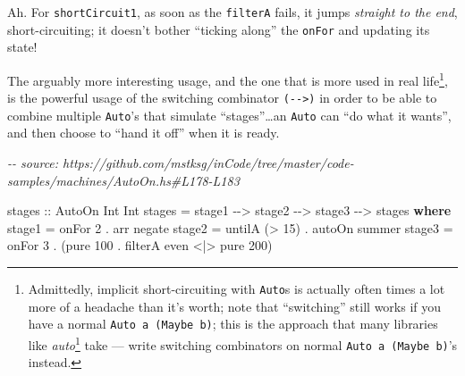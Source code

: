 \documentclass[]{article}
\newenvironment{Shaded}{}{}
\newcommand{\CommentTok}[1]{\textcolor[rgb]{0.38,0.63,0.69}{\textit{#1}}}
\newcommand{\DataTypeTok}[1]{\textcolor[rgb]{0.56,0.13,0.00}{#1}}
\newcommand{\DecValTok}[1]{\textcolor[rgb]{0.25,0.63,0.44}{#1}}
\newcommand{\FunctionTok}[1]{\textcolor[rgb]{0.02,0.16,0.49}{#1}}
\newcommand{\KeywordTok}[1]{\textcolor[rgb]{0.00,0.44,0.13}{\textbf{#1}}}
\newcommand{\NormalTok}[1]{#1}
\newcommand{\OperatorTok}[1]{\textcolor[rgb]{0.40,0.40,0.40}{#1}}
\newcommand{\OtherTok}[1]{\textcolor[rgb]{0.00,0.44,0.13}{#1}}
\renewcommand{\href}[2]{#2\footnote{\url{#1}}}
\begin{document}
Ah. For \texttt{shortCircuit1}, as soon as the \texttt{filterA} fails, it jumps
\emph{straight to the end}, short-circuiting; it doesn't bother ``ticking
along'' the \texttt{onFor} and updating its state!

The arguably more interesting usage, and the one that is more used in real
life\footnote{Admittedly, implicit short-circuiting with \texttt{Auto}s is
  actually often times a lot more of a headache than it's worth; note that
  ``switching'' still works if you have a normal \texttt{Auto\ a\ (Maybe\ b)};
  this is the approach that many libraries like
  \href{https://github.com/mstksg/auto.}{\emph{auto}} take --- write switching
  combinators on normal \texttt{Auto\ a\ (Maybe\ b)}'s instead.}, is the
powerful usage of the switching combinator \texttt{(-\/-\textgreater{})} in
order to be able to combine multiple \texttt{Auto}'s that simulate
``stages''\ldots an \texttt{Auto} can ``do what it wants'', and then choose to
``hand it off'' when it is ready.

\begin{Shaded}
\begin{Highlighting}[]
\CommentTok{{-}{-} source: https://github.com/mstksg/inCode/tree/master/code{-}samples/machines/AutoOn.hs\#L178{-}L183}

\OtherTok{stages ::} \DataTypeTok{AutoOn} \DataTypeTok{Int} \DataTypeTok{Int}
\NormalTok{stages }\OtherTok{=}\NormalTok{ stage1 }\OperatorTok{{-}{-}\textgreater{}}\NormalTok{ stage2 }\OperatorTok{{-}{-}\textgreater{}}\NormalTok{ stage3 }\OperatorTok{{-}{-}\textgreater{}}\NormalTok{ stages}
  \KeywordTok{where}
\NormalTok{    stage1 }\OtherTok{=}\NormalTok{ onFor }\DecValTok{2} \OperatorTok{.}\NormalTok{ arr }\FunctionTok{negate}
\NormalTok{    stage2 }\OtherTok{=}\NormalTok{ untilA (}\OperatorTok{\textgreater{}} \DecValTok{15}\NormalTok{) }\OperatorTok{.}\NormalTok{ autoOn summer}
\NormalTok{    stage3 }\OtherTok{=}\NormalTok{ onFor }\DecValTok{3} \OperatorTok{.}\NormalTok{ (}\FunctionTok{pure} \DecValTok{100} \OperatorTok{.}\NormalTok{ filterA }\FunctionTok{even} \OperatorTok{\textless{}|\textgreater{}} \FunctionTok{pure} \DecValTok{200}\NormalTok{)}
\end{Highlighting}
\end{Shaded}
\end{document}
